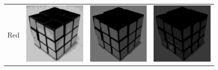 \begin{figure}
\begin{tabular}{rccc}
         Red &
         \includegraphics[width=\rubiklength]{img/rubik/1_rgb_r.jpg} & 
         \includegraphics[width=\rubiklength]{img/rubik/2_rgb_r.jpg} & \includegraphics[width=\rubiklength]{img/rubik/3_rgb_r.jpg}\\
         

\end{tabular}
\end{figure}
